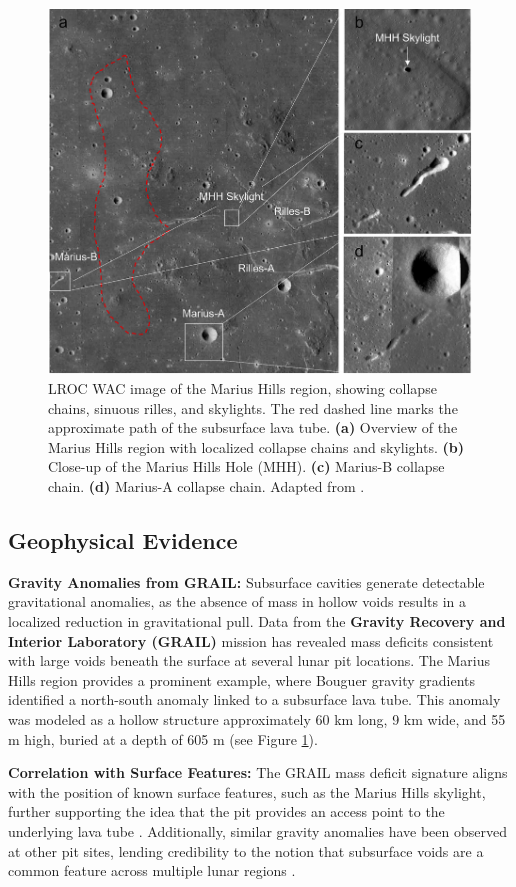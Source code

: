 \begin{figure}[H]
    \centering
    \includegraphics[width=0.66\linewidth]{marius_hills_collapse.png}
    \caption{LROC WAC image of the Marius Hills region, showing collapse chains, sinuous rilles, and skylights. The red dashed line marks the approximate path of the subsurface lava tube. 
    \textbf{(a)} Overview of the Marius Hills region with localized collapse chains and skylights. 
    \textbf{(b)} Close-up of the Marius Hills Hole (MHH). 
    \textbf{(c)} Marius-B collapse chain. 
    \textbf{(d)} Marius-A collapse chain. 
    Adapted from \citet{grails-gradients-mariushills}.}
    \label{fig:marius-hills-collapse}
\end{figure}

\subsection{Geophysical Evidence}

\textbf{Gravity Anomalies from GRAIL:} Subsurface cavities generate detectable gravitational anomalies, as the absence of mass in hollow voids results in a localized reduction in gravitational pull. Data from the \textbf{Gravity Recovery and Interior Laboratory (GRAIL)} mission has revealed mass deficits consistent with large voids beneath the surface at several lunar pit locations. The Marius Hills region provides a prominent example, where Bouguer gravity gradients identified a north-south anomaly linked to a subsurface lava tube. This anomaly was modeled as a hollow structure approximately 60 km long, 9 km wide, and 55 m high, buried at a depth of 605 m \citep{grails-gradients-mariushills} (see Figure \ref{fig:marius-hills-collapse}).

\textbf{Correlation with Surface Features:} The GRAIL mass deficit signature aligns with the position of known surface features, such as the Marius Hills skylight, further supporting the idea that the pit provides an access point to the underlying lava tube \citep{cavities-selene-lavatubes, grails-gradients-mariushills}. Additionally, similar gravity anomalies have been observed at other pit sites, lending credibility to the notion that subsurface voids are a common feature across multiple lunar regions \citep{cavities-selene-lavatubes, new-wagner}.

